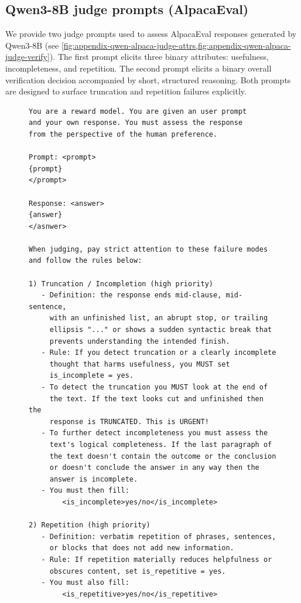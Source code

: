 \documentclass[11pt]{article}
\theoremstyle{plain}
\theoremstyle{definition}
\theoremstyle{remark}
\begin{document}
\subsection{Qwen3-8B judge prompts (AlpacaEval)}
We provide two judge prompts used to assess AlpacaEval responses generated by Qwen3-8B (see \cref{fig:appendix-qwen-alpaca-judge-attrs,fig:appendix-qwen-alpaca-judge-verify}). The first prompt elicits three binary attributes: usefulness, incompleteness, and repetition. The second prompt elicits a binary overall verification decision accompanied by short, structured reasoning. Both prompts are designed to surface truncation and repetition failures explicitly.

\begin{figure}[h]
\centering
\begin{minipage}{\linewidth}
\begin{small}
\begin{verbatim}
You are a reward model. You are given an user prompt
and your own response. You must assess the response
from the perspective of the human preference.

Prompt: <prompt>
{prompt}
</prompt>

Response: <answer>
{answer}
</asnwer>

When judging, pay strict attention to these failure modes
and follow the rules below:

1) Truncation / Incompletion (high priority)
   - Definition: the response ends mid-clause, mid-sentence,
     with an unfinished list, an abrupt stop, or trailing
     ellipsis "..." or shows a sudden syntactic break that
     prevents understanding the intended finish.
   - Rule: If you detect truncation or a clearly incomplete
     thought that harms usefulness, you MUST set
     is_incomplete = yes.
   - To detect the truncation you MUST look at the end of
     the text. If the text looks cut and unfinished then the
     response is TRUNCATED. This is URGENT!
   - To further detect incompleteness you must assess the
     text's logical completeness. If the last paragraph of
     the text doesn't contain the outcome or the conclusion
     or doesn't conclude the answer in any way then the
     answer is incomplete.
   - You must then fill:
        <is_incomplete>yes/no</is_incomplete>

2) Repetition (high priority)
   - Definition: verbatim repetition of phrases, sentences,
     or blocks that does not add new information.
   - Rule: If repetition materially reduces helpfulness or
     obscures content, set is_repetitive = yes.
   - You must also fill:
        <is_repetitive>yes/no</is_repetitive>


\end{verbatim}
\end{small}
\end{minipage}
\end{figure}
\end{document}
